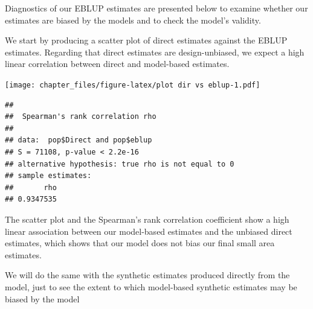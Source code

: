 \documentclass[
]{article}
\newenvironment{Shaded}{\begin{snugshade}}{\end{snugshade}}
\newcommand{\CommentTok}[1]{\textcolor[rgb]{0.56,0.35,0.01}{\textit{#1}}}
\newcommand{\DataTypeTok}[1]{\textcolor[rgb]{0.13,0.29,0.53}{#1}}
\newcommand{\KeywordTok}[1]{\textcolor[rgb]{0.13,0.29,0.53}{\textbf{#1}}}
\newcommand{\NormalTok}[1]{#1}
\newcommand{\OperatorTok}[1]{\textcolor[rgb]{0.81,0.36,0.00}{\textbf{#1}}}
\newcommand{\StringTok}[1]{\textcolor[rgb]{0.31,0.60,0.02}{#1}}
\begin{document}
Diagnostics of our EBLUP estimates are presented below to examine
whether our estimates are biased by the models and to check the model's
validity.

We start by producing a scatter plot of direct estimates against the
EBLUP estimates. Regarding that direct estimates are design-unbiased, we
expect a high linear correlation between direct and model-based
estimates.

\begin{Shaded}
\end{Shaded}

\texttt{[image: chapter\_files/figure-latex/plot dir vs eblup-1.pdf]}

\begin{Shaded}
\end{Shaded}

\begin{verbatim}
## 
##  Spearman's rank correlation rho
## 
## data:  pop$Direct and pop$eblup
## S = 71108, p-value < 2.2e-16
## alternative hypothesis: true rho is not equal to 0
## sample estimates:
##       rho 
## 0.9347535
\end{verbatim}

The scatter plot and the Spearman's rank correlation coefficient show a
high linear association between our model-based estimates and the
unbiased direct estimates, which shows that our model does not bias our
final small area estimates.

We will do the same with the synthetic estimates produced directly from
the model, just to see the extent to which model-based synthetic
estimates may be biased by the model

\begin{Shaded}
\end{Shaded}
\end{document}
